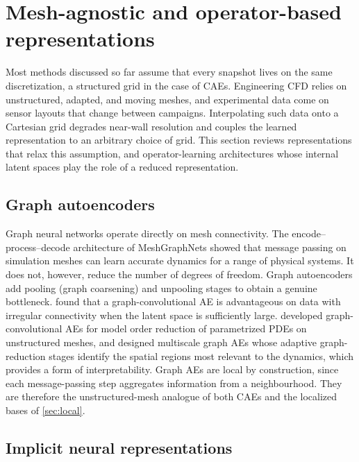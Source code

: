 \section{Mesh-agnostic and operator-based representations}
\label{sec:meshfree}

Most methods discussed so far assume that every snapshot lives on the same
discretization, a structured grid in the case of CAEs. Engineering CFD relies on
unstructured, adapted, and moving meshes, and experimental data come on sensor
layouts that change between campaigns. Interpolating such data onto a Cartesian
grid degrades near-wall resolution and couples the learned representation to
an arbitrary choice of grid. This section reviews representations that relax
this assumption, and operator-learning architectures whose internal latent
spaces play the role of a reduced representation.

\subsection{Graph autoencoders}

Graph neural networks operate directly on mesh connectivity. The
encode--process--decode architecture of MeshGraphNets \parencite{pfaff2021meshgraphnets}
showed that message passing on simulation meshes can learn accurate dynamics
for a range of physical systems. It does not, however, reduce the number of
degrees of freedom. Graph autoencoders add pooling (graph coarsening) and
unpooling stages to obtain a genuine bottleneck. \textcite{gruber2022comparison}
found that a graph-convolutional AE is advantageous on data with irregular
connectivity when the latent space is sufficiently large.
\textcite{pichi2024gca} developed graph-convolutional AEs for model order
reduction of parametrized PDEs on unstructured meshes, and
\textcite{barwey2023multiscale} designed multiscale graph AEs whose adaptive
graph-reduction stages identify the spatial regions most relevant to the
dynamics, which provides a form of interpretability. Graph AEs are local by
construction, since each message-passing step aggregates information from a
neighbourhood. They are therefore the unstructured-mesh analogue of both CAEs
and the localized bases of \cref{sec:local}.

\subsection{Implicit neural representations}
\label{sec:inr}

